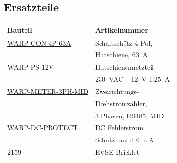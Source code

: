 \documentclass[a4paper,10pt]{article}
\begin{document}
\begin{multicols*}{2}
	\subsection{Ersatzteile}
	\begin{tabular}{ll}
		\toprule
		Bauteil                                                                                             & Artikelnummer                                         \\
		\midrule
		\href{https://www.tinkerforge.com/de/sho./img/contactor-4-pole-din-rail-63a.html}{WARP-CON-4P-63A} & Schaltschütz 4 Pol,                                   \\
		                                                                                                    & Hutschiene, \SI{63}{\ampere}                          \\
		\href{https://www.tinkerforge.com/de/sho./img/din-rail-power-supply-230vac-12vdc-1-2
		5a.html}{WARP-PS-12V}                                                                               & Hutschienennetzteil                                   \\
		                                                                                                    & \SI{230}{\volt}AC – \SI{12}{\volt} \SI{1,25}{\ampere} \\
		\href{https://www.tinkerforge.com/de/sho./img/bidirectional-polyphase-meter-3-phase-
		rs485-mid.html}{WARP-METER-3PH-MID}                                                                 & Zweirichtungs-                                        \\
		                                                                                                    & Drehstromzähler,                                      \\
		                                                                                                    & 3 Phasen, RS485, MID                                  \\
		\href{https://www.tinkerforge.com/de/sho./img/dc-residual-current-protection-module-
		6ma.html}{WARP-DC-PROTECT}                                                                          & DC Fehlerstrom                                        \\
		                                                                                                    & Schutzmodul \SI{6}{\milli\ampere}                     \\
		2159                                                                                                & EVSE Bricklet                                         \\

\end{tabular}
\end{multicols*}
\end{document}
